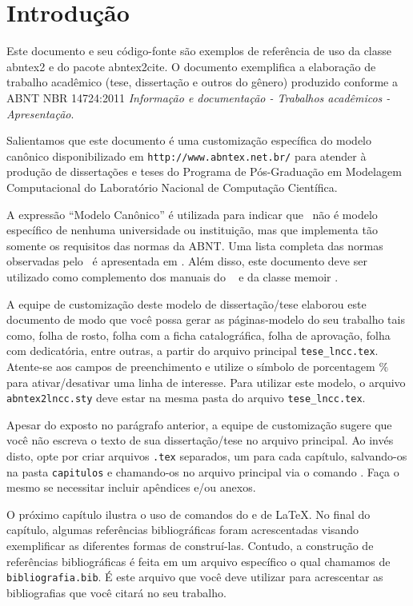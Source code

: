 \chapter[Introdução]{Introdução}\label{cap_intro}

Este documento e seu código-fonte são exemplos de referência de uso da classe
\textsf{abntex2} e do pacote \textsf{abntex2cite}. O documento
exemplifica a elaboração de trabalho acadêmico (tese, dissertação e outros do
gênero) produzido conforme a ABNT NBR 14724:2011 \emph{Informação e documentação
- Trabalhos acadêmicos - Apresentação}.

Salientamos que este documento é uma customização específica do modelo canônico
disponibilizado em \verb"http://www.abntex.net.br/" para atender à produção de
dissertações e teses do Programa de Pós-Graduação em Modelagem Computacional do
Laboratório Nacional de Computação Científica.

A expressão ``Modelo Canônico'' é utilizada para indicar que \abnTeX\ não é
modelo específico de nenhuma universidade ou instituição, mas que implementa tão
somente os requisitos das normas da ABNT. Uma lista completa das normas
observadas pelo \abnTeX\ é apresentada em . Além disso,
este documento deve ser utilizado como complemento dos manuais do \abnTeX\
\cite{abntex2classe,abntex2cite,abntex2cite-alf} e da classe \textsf{memoir}
\cite{memoir}.

A equipe de customização deste modelo de dissertação/tese elaborou este documento
de modo que você possa gerar as páginas-modelo do seu trabalho tais como, folha de
rosto, folha com a ficha catalográfica, folha de aprovação, folha com dedicatória,
entre outras, a partir do arquivo principal \verb"tese_lncc.tex". Atente-se aos
campos de preenchimento e utilize o símbolo de porcentagem $\%$ para ativar/desativar
uma linha de interesse. Para utilizar este modelo, o arquivo \verb"abntex2lncc.sty" deve
estar na mesma pasta do arquivo \verb"tese_lncc.tex".

Apesar do exposto no parágrafo anterior, a equipe de customização sugere que você não
escreva o texto de sua dissertação/tese no arquivo principal. Ao invés disto, opte por
criar arquivos \verb".tex" separados, um para cada capítulo, salvando-os na pasta
\verb"capitulos" e chamando-os no arquivo principal via o comando
\verb"". Faça o mesmo se necessitar incluir apêndices
e/ou anexos.

O próximo capítulo ilustra o uso de comandos do \abnTeX e de \LaTeX. No final do capítulo,
algumas referências bibliográficas foram acrescentadas visando exemplificar as diferentes
formas de construí-las. Contudo, a construção de referências bibliográficas é feita em um
arquivo específico o qual chamamos de \verb"bibliografia.bib". É este arquivo que você deve
utilizar para acrescentar as bibliografias que você citará no seu trabalho.

